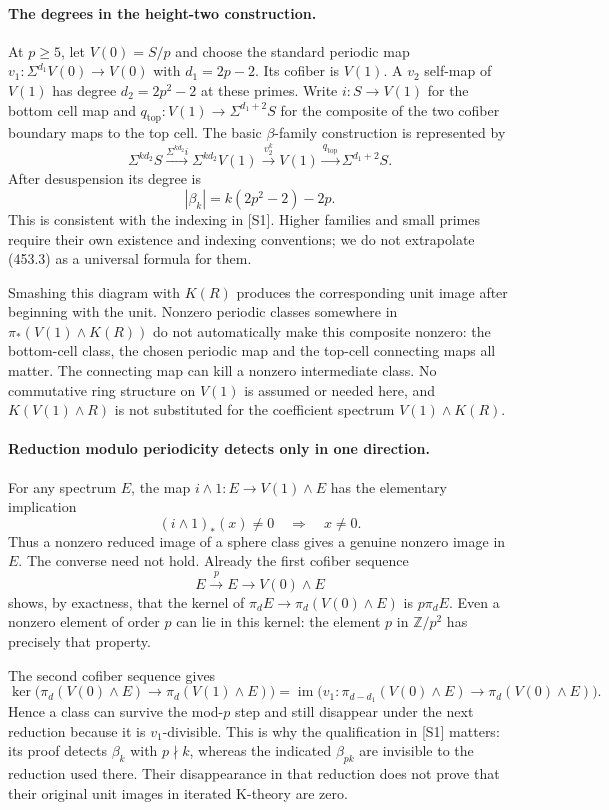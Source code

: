 \documentclass[11pt]{article}
\begin{document}
\paragraph{The degrees in the height-two construction.}
At $p\geq5$, let $V(0)=S/p$ and choose the standard periodic map
$v_1:\Sigma^{d_1}V(0)\to V(0)$ with $d_1=2p-2$.
Its cofiber is $V(1)$. A $v_2$ self-map of $V(1)$ has degree
$d_2=2p^2-2$ at these primes. Write $i:S\to V(1)$ for the bottom
cell map and $q_\mathrm{top}:V(1)\to\Sigma^{d_1+2}S$ for the
composite of the two cofiber boundary maps to the top cell.
The basic $\beta$-family construction is represented by
\[
 \Sigma^{kd_2}S\stackrel{\Sigma^{kd_2}i}{\longrightarrow}
 \Sigma^{kd_2}V(1)\stackrel{v_2^k}{\longrightarrow}V(1)
 \stackrel{q_\mathrm{top}}{\longrightarrow}\Sigma^{d_1+2}S.
\]
After desuspension its degree is
\[
 |\beta_k|=k(2p^2-2)-2p.
 \tag{453.3}
\]
This is consistent with the indexing in [S1]. Higher families and
small primes require their own existence and indexing conventions;
we do not extrapolate (453.3) as a universal formula for them.

Smashing this diagram with $K(R)$ produces the corresponding unit
image after beginning with the unit. Nonzero periodic classes somewhere
in $\pi_*(V(1)\wedge K(R))$ do not automatically make this composite
nonzero: the bottom-cell class, the chosen periodic map and the
top-cell connecting maps all matter. The connecting map can kill a
nonzero intermediate class. No commutative ring structure on $V(1)$
is assumed or needed here, and $K(V(1)\wedge R)$ is not substituted
for the coefficient spectrum $V(1)\wedge K(R)$.

\paragraph{Reduction modulo periodicity detects only in one direction.}
For any spectrum $E$, the map $i\wedge1:E\to V(1)\wedge E$
has the elementary implication
\[
 (i\wedge1)_*(x)\ne0\quad\Longrightarrow\quad x\ne0.
 \tag{453.4}
\]
Thus a nonzero reduced image of a sphere class gives a genuine
nonzero image in $E$. The converse need not hold. Already the first
cofiber sequence
\[
 E\stackrel{p}{\longrightarrow}E\longrightarrow V(0)\wedge E
\]
shows, by exactness, that the kernel of
$\pi_dE\to\pi_d(V(0)\wedge E)$ is $p\pi_dE$.
Even a nonzero element of order $p$ can lie in this kernel: the
element $p$ in $\mathbb Z/p^2$ has precisely that property.

The second cofiber sequence gives
\[
 \ker\bigl(\pi_d(V(0)\wedge E)\to\pi_d(V(1)\wedge E)\bigr)
 =\operatorname{im}\bigl(v_1:\pi_{d-d_1}(V(0)\wedge E)
                              \to\pi_d(V(0)\wedge E)\bigr).
 \tag{453.5}
\]
Hence a class can survive the mod-$p$ step and still disappear under
the next reduction because it is $v_1$-divisible. This is why the
qualification in [S1] matters: its proof detects $\beta_k$ with
$p\nmid k$, whereas the indicated $\beta_{pk}$ are invisible to
the reduction used there. Their disappearance in that reduction
does not prove that their original unit images in iterated K-theory
are zero.
\end{document}
